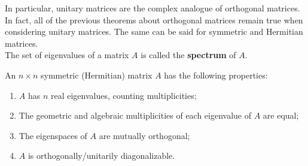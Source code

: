 In particular, unitary matrices are the complex analogue of orthogonal matrices. In fact, all of the previous theorems about orthogonal matrices remain true when considering unitary matrices. The same can be said for symmetric and Hermitian matrices. \\

The set of eigenvalues of a matrix $A$ is called the \textbf{spectrum} of $A$.\\%

\begin{Thm} An $n\times n$ symmetric (Hermitian) matrix $A$ has the following properties:
\begin{enumerate}[!THM!, start=1]
\item $A$ has $n$ real eigenvalues, counting multiplicities;
\item The geometric and algebraic multiplicities of each eigenvalue of $A$ are equal;
\item The eigenspaces of $A$ are mutually orthogonal;
\item $A$ is orthogonally/unitarily diagonalizable.
\end{enumerate}
\end{Thm}
\vs


